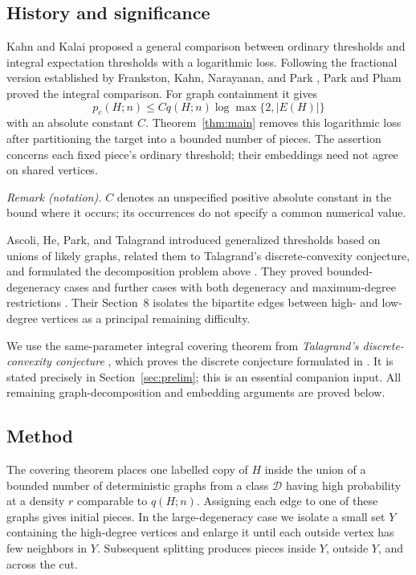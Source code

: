 \documentclass[11pt]{article}
\theoremstyle{remark}
\numberwithin{equation}{section}
\newcommand{\calD}{\mathcal D}
\begin{document}
\subsection*{History and significance}
Kahn and Kalai \cite{KK07} proposed a general comparison between
ordinary thresholds and integral expectation thresholds with a
logarithmic loss. Following the fractional version established by
Frankston, Kahn, Narayanan, and Park \cite{FKNP21}, Park and Pham
\cite{PP24} proved the integral comparison. For graph containment
it gives
\[
 p_c(H;n)\leq Cq(H;n)\log\max\{2,|E(H)|\}
\]
with an absolute constant $C$. Theorem~\ref{thm:main} removes
this logarithmic loss after partitioning the target into a bounded
number of pieces. The assertion concerns each fixed piece's
ordinary threshold; their embeddings need not agree on shared
vertices.

\noindent\textit{Remark (notation).} $C$ denotes an unspecified positive absolute constant in the bound where it occurs; its occurrences do not specify a common numerical value.


Ascoli, He, Park, and Talagrand introduced generalized thresholds
based on unions of likely graphs, related them to Talagrand's
discrete-convexity conjecture, and formulated the decomposition
problem above \cite{AHPT26}. They proved bounded-degeneracy
cases and further cases with both degeneracy and maximum-degree
restrictions \cite[Theorems~1.12--1.13]{AHPT26}. Their
Section~8 isolates the bipartite edges between high- and
low-degree vertices as a principal remaining difficulty.

We use the same-parameter integral covering theorem from
\emph{Talagrand's discrete-convexity conjecture}
\cite[Theorem~1.1]{OpenAI26DC}, which proves the discrete
conjecture formulated in \cite[Conjecture~7.1]{Talagrand10}.
It is stated precisely in Section~\ref{sec:prelim}; this is an
essential companion input. All remaining graph-decomposition and
embedding arguments are proved below.

\subsection*{Method}
The covering theorem places one labelled copy of $H$ inside the
union of a bounded number of deterministic graphs from a class
$\calD$ having high probability at a density $r$ comparable to
$q(H;n)$. Assigning each edge to one of these graphs gives initial
pieces. In the large-degeneracy case we isolate a small set $Y$
containing the high-degree vertices and enlarge it until each
outside vertex has few neighbors in $Y$. Subsequent splitting
produces pieces inside $Y$, outside $Y$, and across the cut.
\end{document}
